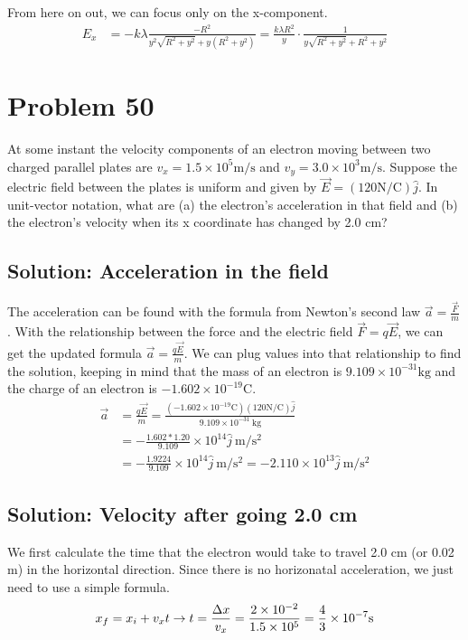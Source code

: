 \documentclass[12pt]{article}
\begin{document}
From here on out, we can focus only on the x-component.
\begin{align*}
    E_x &=  -k\lambda \frac{-R^2}{y^2\sqrt{R^2 + y^2} + y(R^2 + y^2)}
        =   \frac{k\lambda R^2}{y} \cdot \frac{1}{y\sqrt{R^2 + y^2} + R^2 + y^2}
\end{align*}

\pagebreak
\section{Problem 50}
At some instant the velocity components of an electron moving between two charged parallel plates are $v_x = 1.5 \times 10^5 \unit{\meter/\second}$ and $v_y = 3.0 \times 10^3 \unit{\meter/\second}$. Suppose the electric field between the plates is uniform and given by $\vec{E} = (120 \unit{\newton/\coulomb})\hat{j}$. In unit-vector notation, what are (a) the electron's acceleration in that field and (b) the electron's velocity when its x coordinate has changed by 2.0 cm?

\subsection{Solution: Acceleration in the field}
The acceleration can be found with the formula from Newton's second law \(\vec{a} = \frac{\vec{F}}{m}\).
With the relationship between the force and the electric field \(\vec{F} = q\vec{E}\), we can get the updated formula \(\vec{a} = \frac{q\vec{E}}{m}\). 
We can plug values into that relationship to find the solution, keeping in mind that the mass of an electron is $9.109 \times 10^{-31} \unit{\kilo\gram}$ and the charge of an electron is $-1.602 \times 10^{-19} \unit{\coulomb}$.
\begin{align*}
    \vec{a} &=  \frac{q\vec{E}}{m} = \frac{(-1.602 \times 10^{-19} \unit{\coulomb})(120 \unit{\newton/\coulomb})\hat{j}}{9.109 \times 10^{-31}\ \unit{\kilo\gram}}\\
        &=  -\frac{1.602 * 1.20}{9.109} \times 10^{14}\hat{j}\ \unit{\meter/\second^2}\\
        &=  -\frac{1.9224}{9.109} \times 10^{14}\hat{j}\ \unit{\meter/\second^2}
        =   \boxed{-2.110 \times 10^{13} \hat{j}\ \unit{\meter/\second^2}}
\end{align*}

\subsection{Solution: Velocity after going 2.0 cm}
We first calculate the time that the electron would take to travel 2.0 cm (or 0.02 m) in the horizontal direction. Since there is no horizonatal acceleration, we just need to use a simple formula.
\begin{equation*}
    x_f =   x_i + v_x t\rightarrow\\
    t   =   \frac{\Delta x}{v_x}
        =   \frac{2 \times 10^{-2}}{1.5 \times 10^5}
        =   \frac{4}{3} \times 10^{-7} \unit{\second}
\end{equation*}
\end{document}
